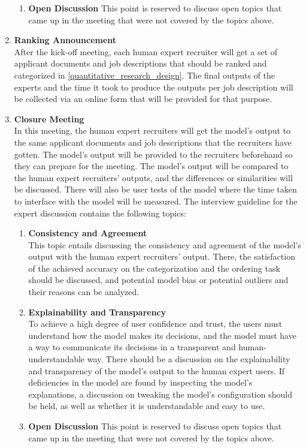 \documentclass[draft,final]{thesisclass} %
\begin{document}
\begin{enumerate}
\begin{enumerate}
        \item \textbf{Open Discussion}
        This point is reserved to discuss open topics that came up in the meeting that were not covered by the topics above.
    \end{enumerate}
    \item \textbf{Ranking Announcement} \label{ranking_announcement}\\
    After the kick-off meeting, each human expert recruiter will get a set of applicant documents and job descriptions that should be ranked and categorized in \ref{quantitative_research_design}.
    The final outputs of the experts and the time it took to produce the outputs per job description will be collected via an online form that will be provided for that purpose.
    \item \textbf{Closure Meeting} \label{closure_meeting}\\ 
    In this meeting, the human expert recruiters will get the model's output to the same applicant documents and job descriptions that the recruiters have gotten.
    The model's output will be provided to the recruiters beforehand so they can prepare for the meeting.
    The model's output will be compared to the human expert recruiters' outputs, and the differences or similarities will be discussed.
    There will also be user tests of the model where the time taken to interface with the model will be measured.
    The interview guideline for the expert discussion contains the following topics:
    \begin{enumerate} 
        \item \textbf{Consistency and Agreement}\\
        This topic entails discussing the consistency and agreement of the model's output with the human expert recruiters' output.
        There, the satisfaction of the achieved accuracy on the categorization and the ordering task should be discussed, and potential model bias or potential outliers and their reasons can be analyzed.
        \item \textbf{Explainability and Transparency}\\
        To achieve a high degree of user confidence and trust, the users must understand how the model makes its decisions, and the model must have a way to communicate its decisions in a transparent and human-understandable way.
        There should be a discussion on the explainability and transparency of the model's output to the human expert users.
        If deficiencies in the model are found by inspecting the model's explanations, a discussion on tweaking the model's configuration should be held, as well as whether it is understandable and easy to use.
        \item \textbf{Open Discussion}
        This point is reserved to discuss open topics that came up in the meeting that were not covered by the topics above.
    \end{enumerate}
\end{enumerate}
\end{document}

